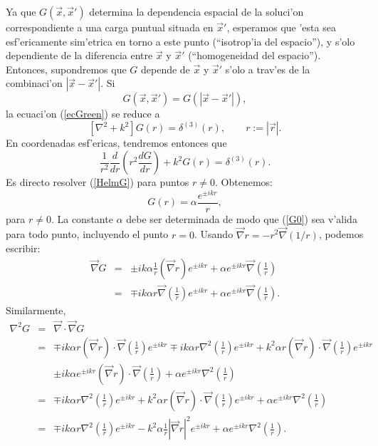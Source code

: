 Ya que $G(\vec{x},\vec{x}')$ determina la dependencia espacial de la soluci'on correspondiente a una carga puntual situada en $\vec{x}'$, esperamos que 'esta sea esf'ericamente sim'etrica en torno a este punto (``isotrop'ia del espacio''), y s'olo dependiente de la diferencia entre $\vec{x}$ y $\vec{x}'$ (``homogeneidad del espacio''). Entonces, supondremos que $G$ depende de $\vec{x}$ y $\vec{x}'$ s'olo a trav'es de la combinaci'on $|\vec{x}-\vec{x}'|$. Si
\begin{equation}
G(\vec{x},\vec{x}')=G(|\vec{x}-\vec{x}'|),
\end{equation}
 la ecuaci'on (\ref{ecGreen}) se reduce a
\begin{equation}
\left[ \nabla^2+k^2\right] G(r)=\delta^{(3)}(r), \qquad r:=|\vec{r}|.
\end{equation}
En coordenadas esf'ericas, tendremos entonces que
\begin{equation}
 \frac{1}{r^2}\frac{d}{dr}\left( r^2\frac{dG}{dr}\right) +k^2G(r)=\delta^{(3)}(r)
.\label{HelmG}
\end{equation}
Es directo resolver (\ref{HelmG}) para puntos $r\neq 0$. Obtenemos:
\begin{equation}
G(r)=\alpha\frac{e^{\pm ikr}}{r}, \label{G0}
\end{equation}
para $r\neq 0$. La constante $\alpha$ debe ser determinada de modo que
(\ref{G0}) sea v'alida para todo punto, incluyendo el punto $r=0$. Usando
$\vec{\nabla}r=-r^2\vec{\nabla}\left({1}/{r}\right) $, podemos escribir:
\begin{eqnarray}
\vec{\nabla}G&=&\pm ik\alpha\frac{1}{r}\left( \vec{\nabla}r\right) e^{\pm
ikr}+\alpha e^{\pm ikr} \vec{\nabla}\left( \frac{1}{r}\right) \\
&=&\mp ik\alpha r\vec{\nabla}\left( \frac{1}{r}\right)  e^{\pm ikr}+\alpha
e^{\pm ikr} \vec{\nabla}\left( \frac{1}{r}\right) .
\end{eqnarray}
Similarmente,
\begin{eqnarray}
\nabla^2G&=&\vec{\nabla}\cdot \vec{\nabla}G \\
&=&\mp ik\alpha r\left( \vec{\nabla}r\right)\cdot\vec{\nabla}\left(
\frac{1}{r}\right)  e^{\pm ikr}\mp ik\alpha r \nabla^2\left( \frac{1}{r}\right)
e^{\pm ikr}+k^2\alpha r\left( \vec{\nabla}r\right)\cdot\vec{\nabla}\left(
\frac{1}{r}\right)  e^{\pm ikr}\nonumber\\
&&\pm ik\alpha e^{\pm ikr} \left( \vec{\nabla}r\right)\cdot\vec{\nabla}\left(
\frac{1}{r}\right) +\alpha e^{\pm ikr}\nabla^2\left( \frac{1}{r}\right) \\
&=&\mp ik\alpha r \nabla^2\left( \frac{1}{r}\right)  e^{\pm ikr}+k^2\alpha
r\left( \vec{\nabla}r\right)\cdot\vec{\nabla}\left( \frac{1}{r}\right)  e^{\pm
ikr}+\alpha e^{\pm ikr}\nabla^2\left( \frac{1}{r}\right) \\
&=&\mp ik\alpha r \nabla^2\left( \frac{1}{r}\right)  e^{\pm ikr}-k^2\alpha
\frac{1}{r} \left|\vec{\nabla}r\right|^2  e^{\pm ikr}+\alpha e^{\pm
ikr}\nabla^2\left( \frac{1}{r}\right).
\end{eqnarray}
